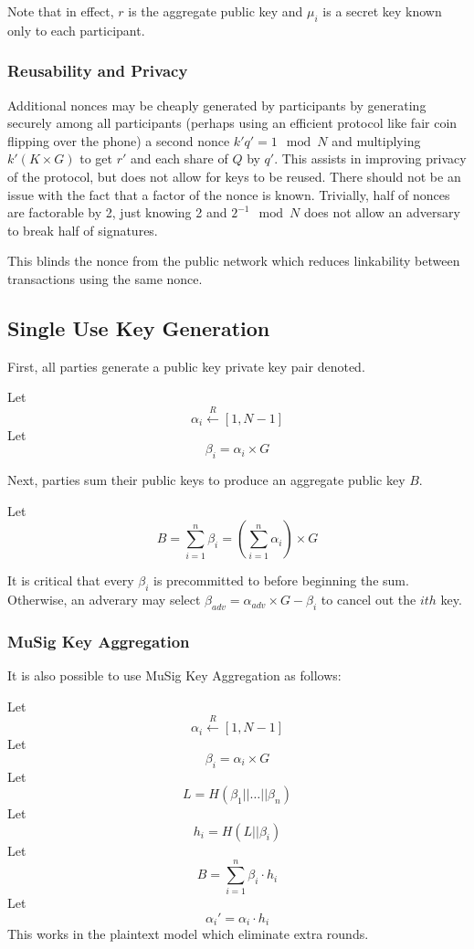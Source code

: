 \documentclass{article}
\begin{document}
Note that in effect, $r$ is the aggregate public key and $\mu_i$ is a secret key known only to each participant.

\subsubsection{Reusability and Privacy}

Additional nonces may be cheaply generated by
participants by generating securely among all participants (perhaps using an efficient protocol like fair
coin flipping over the phone) a second nonce $k'q' = 1 \mod N$ and multiplying $k'(K\times G)$ to get
$r'$ and each share of $Q$ by $q'$. This assists in improving privacy of the
protocol, but does not allow for keys to be reused. There should not be an issue with the fact that a factor of the nonce is known. Trivially, half of nonces are factorable by 2, just knowing 2 and $2^{-1} \mod N$ does not allow an adversary to break half of signatures.

This blinds the nonce from the public network which reduces linkability between transactions using the same nonce.


\subsection{Single Use Key Generation}

First, all parties generate a public key private key pair denoted.

Let $$\alpha_i \xleftarrow{R} [1, N-1]$$
Let $$\beta_i = \alpha_i \times G$$

Next, parties sum their public keys to produce an aggregate public key $B$.

Let $$ B = \sum\limits_{i = 1}^n \beta_i = \left(\sum\limits_{i=1}^n \alpha_i\right) \times G$$

It is critical that every $\beta_i$ is precommitted to before beginning the sum. Otherwise, an adverary may select $\beta_{adv} = \alpha_{adv}\times G - \beta_i$ to cancel out the $ith$ key.

\subsubsection{MuSig Key Aggregation}

It is also possible to use MuSig Key Aggregation as follows:

Let $$\alpha_i \xleftarrow{R} [1, N-1]$$
Let $$\beta_i = \alpha_i \times G$$
Let $$L = H(\beta_1 ||\ldots || \beta_n)$$
Let $$h_i = H(L || \beta_i)$$
Let $$ B = \sum\limits_{i = 1}^n \beta_i\cdot h_i$$
Let $$\alpha_i' = \alpha_i \cdot h_i$$
This works in the plaintext model which eliminate extra rounds.
\end{document}
